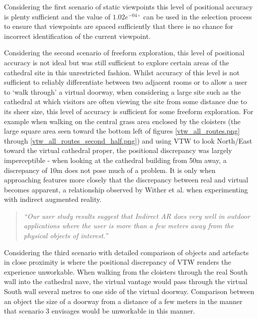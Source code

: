 Considering the first scenario of static viewpoints this level of positional accuracy is plenty sufficient and the value of $1.02e^{-04\circ}$ can be used in the selection process to ensure that viewpoints are spaced sufficiently that there is no chance for incorrect identification of the current viewpoint.

Considering the second scenario of freeform exploration, this level of positional accuracy is not ideal but was still sufficient to explore certain areas of the cathedral site in this unrestricted fashion. Whilst accuracy of this level is not sufficient to reliably differentiate between two adjacent rooms or to allow a user to `walk through' a virtual doorway, when considering a large site such as the cathedral at which visitors are often viewing the site from some distance due to its sheer size, this level of accuracy is sufficient for some freeform exploration. For example when walking on the central grass area enclosed by the cloisters (the large square area seen toward the bottom left of figures \ref{vtw_all_routes.png} through \ref{vtw_all_routes_second_half.png}) and using VTW to look North/East toward the virtual cathedral proper, the positional discrepancy was largely imperceptible - when looking at the cathedral building from 50m away, a discrepancy of 10m does not pose much of a problem. It is only when approaching features more closely that the discrepancy between real and virtual becomes apparent, a relationship observed by Wither et al. when experimenting with indirect augmented reality.

\begin{quote}
	\textit{``Our user study results suggest that Indirect AR does very well in outdoor applications where the user is more than a few meters away from the physical objects of interest.''}~\cite{Wither2011}
\end{quote}

Considering the third scenario with detailed comparison of objects and artefacts in close proximity is where the positional discrepancy of VTW renders the experience unworkable. When walking from the cloisters through the real South wall into the cathedral nave, the virtual vantage would pass through the virtual South wall several metres to one side of the virtual doorway. Comparison between an object the size of a doorway from a distance of a few meters in the manner that scenario 3 envisages would be unworkable in this manner.


